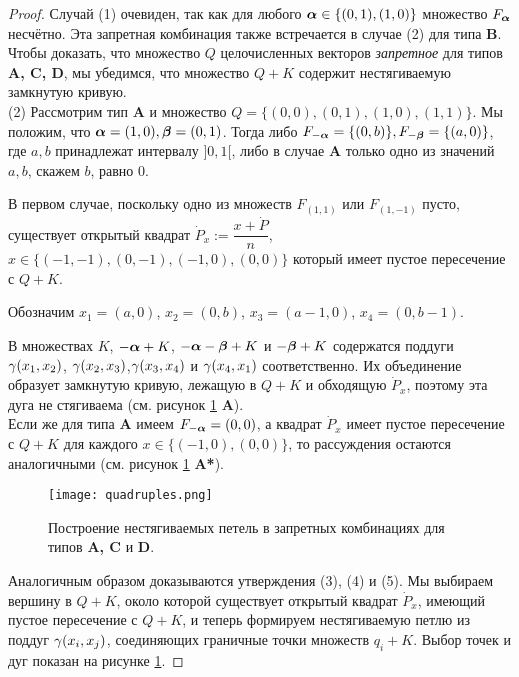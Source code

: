 \begin{proof} 

Случай (1) очевиден, так как для любого ${\bm{\alpha}}\in\{(0,1),(1,0)\}$ множество $F_{\bm{\alpha}}$ несчётно.
Эта запретная комбинация также встречается в случае (2) для типа {\bf B}.\\

Чтобы доказать, что множество $Q$ целочисленных векторов {\em запретное} для типов {\bf A, C, D}, мы убедимся, что множество $Q+K$ содержит нестягиваемую замкнутую  кривую.\\

(2)  Рассмотрим тип {\bf A} и множество $Q=\{(0,0), (0,1), (1,0), (1,1)\}$. 
Мы положим, что ${\bm{\alpha}}=(1,0), {\bm{\beta}}=(0,1)$. 
Тогда   либо $F_{-{\bm{\alpha}}}=\{(0,b)\}, F_{-{\bm{\beta}}}=\{(a,0)\}$, где $a,b$ принадлежат интервалу $]0,1[$,  либо в случае {\bf A} только одно из значений $a,b$, скажем $b$, равно $0$.

В первом случае, поскольку одно из множеств $F_{(1,1)}$ или $F_{(1,-1)}$ пусто, существует открытый квадрат $\dot P_x:=\dfrac{x+\dot P}{n}$, $x\in \{(-1,-1),(0,-1), (-1,0), (0,0)\}$ который имеет пустое пересечение с $Q+K$. 

Обозначим $x_1=(a,0)$, $x_2=(0,b)$, $x_3=(a-1,0)$, $x_4=(0,b-1)$. 

В множествах  $K$, $-{\bm{\alpha}}+K$, $-{\bm{\alpha}}-{\bm{\beta}}+K$ и $-{\bm{\beta}}+K$ содержатся поддуги  $\gamma(x_1,x_2)$, $\gamma(x_2,x_3)$,$\gamma(x_3,x_4)$ и $\gamma(x_4,x_1)$ соответственно. 
Их объединение образует замкнутую кривую, лежащую в $Q+K$ и обходящую $\dot P_x$, поэтому эта дуга не стягиваема (см. рисунок \ref{forbid} {\bf A}).\\ 

Если же для типа {\bf A} имеем $F_{-{\bm{\alpha}}}=(0,0)$, а квадрат $\dot P_x$ имеет пустое пересечение с $Q+K$ для каждого $x\in\{(-1,0), (0,0)\}$, то рассуждения остаются аналогичными (см. рисунок \ref{forbid} {\bf A*}).\\

\begin{figure}[h] 
    \centering
    \texttt{[image: quadruples.png]}
    \caption{Построение нестягиваемых петель в запретных комбинациях для типов {\bf A, C} и {\bf D}.}
    \label{forbid}
\end{figure}

Аналогичным образом доказываются утверждения (3), (4) и (5).
Мы выбираем вершину в $Q+K$, около которой существует открытый квадрат $\dot P_x$, имеющий пустое пересечение с $Q+K$, и теперь формируем нестягиваемую петлю из поддуг $\gamma(x_i,x_j)$, соединяющих граничные точки множеств $q_i+K$.
Выбор точек и дуг показан на рисунке \ref{forbid}.
\end{proof}


